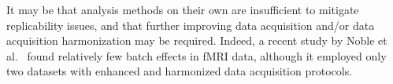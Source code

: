 \documentclass[11pt]{article}
\begin{document}
\begin{multicols}{2}


It may be that analysis methods on their own are insufficient to mitigate replicability issues, and that further improving data acquisition and/or data acquisition harmonization may be required. Indeed, a recent study by Noble et al.~\cite{Noble2017} found relatively few batch effects in fMRI data, although it employed only two datasets with enhanced and harmonized data acquisition protocols. 






\end{multicols}
\end{document}
